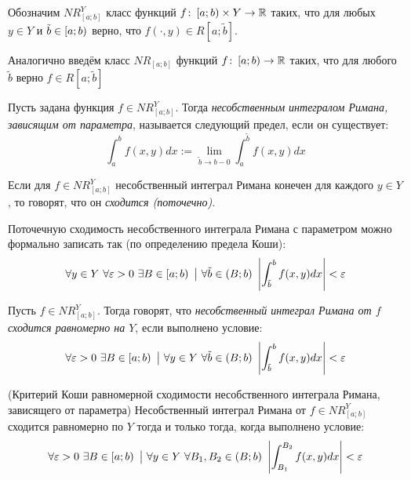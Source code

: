 \begin{designation}
	Обозначим $NR_{[a; b]}^Y$ класс функций $f \colon \left[a; b\right) \times Y \to \mathbb{R}$ таких, что для любых $y \in Y$ и $\tilde{b} \in \left[a; b\right)$ верно, что $f(\cdot, y) \in R[a; \tilde{b}]$.
\end{designation}

\begin{designation}
	Аналогично введём класс $NR_{[a; b]}$ функций $f \colon \left[a; b\right) \to \mathbb{R}$ таких, что для любого $\tilde{b}$ верно $f \in R[a; \tilde{b}]$
\end{designation}

\begin{definition} 
	Пусть задана функция $f \in NR_{[a; b]}^Y$. Тогда \textit{несобственным интегралом Римана, зависящим от параметра}, называется следующий предел, если он существует:
	\[
		\int_a^b f(x, y)dx := \lim_{\tilde{b} \to b-0} \int_a^{\tilde{b}} f(x, y)dx
	\]
\end{definition}

\begin{definition}
	Если для $f \in NR_{[a; b]}^Y$ несобственный интеграл Римана конечен для каждого $y \in Y$, то говорят, что он \textit{сходится (поточечно)}.
\end{definition}

\begin{note}
	Поточечную сходимость несобственного интеграла Римана с параметром можно формально записать так (по определению предела Коши):
	\[
		\forall y \in Y\ \forall \eps > 0\ \exists B \in \lsi{a; b} \such \forall \tilde{b} \in (B; b) \ \md{\int_{\tilde{b}}^b f(x, y)dx} < \eps
	\]
\end{note}

\begin{definition}
	Пусть $f \in NR_{[a; b]}^Y$. Тогда говорят, что \textit{несобственный интеграл Римана от $f$ сходится равномерно на $Y$}, если выполнено условие:
	\[
		\forall \varepsilon > 0\ \exists B \in \left[a; b\right) \ \big|\  \forall y \in Y\ \forall \tilde{b} \in (B; b) \ \left|\int_{\tilde{b}}^b f(x, y)dx\right| < \varepsilon
	\]
\end{definition}

\begin{theorem} (Критерий Коши равномерной сходимости несобственного интеграла Римана, зависящего от параметра)
	Несобственный интеграл Римана от $f \in NR_{[a; b]}^Y$ сходится равномерно по $Y$ тогда и только тогда, когда выполнено условие:
	\[
		\forall \eps > 0\ \exists B \in \lsi{a; b} \such \forall y \in Y\ \forall B_1, B_2 \in (B; b) \ \md{\int_{B_1}^{B_2} f(x, y)dx} < \eps
	\]
\end{theorem}

